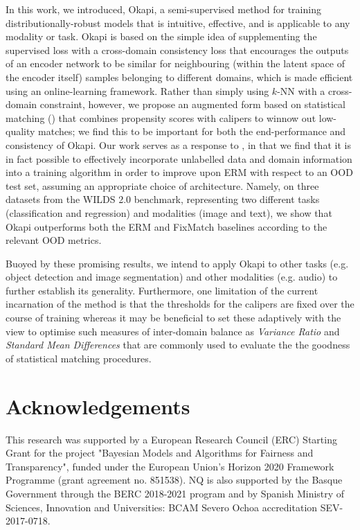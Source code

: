 In this work, we introduced, Okapi, a semi-supervised method for training distributionally-robust
models that is intuitive, effective, and is applicable to any modality or task.
%
Okapi is based on the simple idea of supplementing the supervised loss with a cross-domain
consistency loss that encourages the outputs of an encoder network to be similar for neighbouring
(within the latent space of the encoder itself) samples  belonging to different domains, which is
made efficient using an online-learning framework.
%
Rather than simply using $k$-NN with a cross-domain constraint, however, we propose an augmented
form based on statistical matching (\CNN) that combines propensity scores with calipers to winnow
out low-quality matches; we find this to be important for both the end-performance and consistency
of Okapi.
%
Our work serves as a response to \cite{SagWeiLeeGaoetal22}, in that we find that it is in fact
possible to effectively incorporate unlabelled data and domain information into a training
algorithm in order to improve upon ERM with respect to an OOD test set, assuming an appropriate
choice of architecture.
%
Namely, on three datasets from the WILDS 2.0 benchmark, representing two different tasks
(classification and regression) and modalities (image and text), we show that Okapi outperforms
both the ERM and FixMatch baselines according to the relevant OOD metrics.
%

Buoyed by these promising results, we intend to apply Okapi to other tasks (e.g. object detection
and image segmentation) and other modalities (e.g. audio) to further establish its generality.
%
Furthermore, one limitation of the current incarnation of the method is that the thresholds for the
calipers are fixed over the course of training whereas it may be beneficial to set these adaptively
with the view to optimise such measures of inter-domain balance as \emph{Variance Ratio} and
\emph{Standard Mean Differences} that are commonly used to evaluate the the goodness of statistical
matching procedures.

\section*{Acknowledgements}
This research was supported by a European Research Council (ERC) Starting Grant for the project
"Bayesian Models and Algorithms for Fairness and Transparency", funded under the European Union's
Horizon 2020 Framework Programme (grant agreement no. 851538). NQ is also supported by the Basque
Government through the BERC 2018-2021 program and by Spanish Ministry of Sciences, Innovation and
Universities: BCAM Severo Ochoa accreditation SEV-2017-0718.
